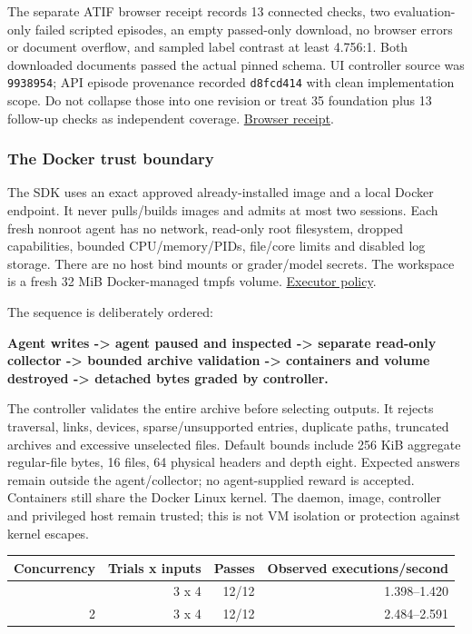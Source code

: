 \documentclass[
  11pt,
  letterpaper,
]{article}
\newcounter{none} %
\begin{document}
The separate ATIF browser receipt records 13 connected checks, two
evaluation-only failed scripted episodes, an empty passed-only download,
no browser errors or document overflow, and sampled label contrast at
least 4.756:1. Both downloaded documents passed the actual pinned
schema. UI controller source was \texttt{9938954}; API episode
provenance recorded \texttt{d8fcd414} with clean implementation scope.
Do not collapse those into one revision or treat 35 foundation plus 13
follow-up checks as independent coverage.
\href{../../artifacts/atif/qa/ui-report.json}{Browser receipt}.

\subsubsection{The Docker trust
boundary}\label{the-docker-trust-boundary}

The SDK uses an exact approved already-installed image and a local
Docker endpoint. It never pulls/builds images and admits at most two
sessions. Each fresh nonroot agent has no network, read-only root
filesystem, dropped capabilities, bounded CPU/memory/PIDs, file/core
limits and disabled log storage. There are no host bind mounts or
grader/model secrets. The workspace is a fresh 32 MiB Docker-managed
tmpfs volume. \href{../docker-executor.md}{Executor policy}.

The sequence is deliberately ordered:

\textbf{Agent writes -\textgreater{} agent paused and inspected
-\textgreater{} separate read-only collector -\textgreater{} bounded
archive validation -\textgreater{} containers and volume destroyed
-\textgreater{} detached bytes graded by controller.}

The controller validates the entire archive before selecting outputs. It
rejects traversal, links, devices, sparse/unsupported entries, duplicate
paths, truncated archives and excessive unselected files. Default bounds
include 256 KiB aggregate regular-file bytes, 16 files, 64 physical
headers and depth eight. Expected answers remain outside the
agent/collector; no agent-supplied reward is accepted. Containers still
share the Docker Linux kernel. The daemon, image, controller and
privileged host remain trusted; this is not VM isolation or protection
against kernel escapes.

{\def\LTcaptype{none} %
\begin{longtable}[]{@{}rrrr@{}}
\toprule\noalign{}
Concurrency & Trials x inputs & Passes & Observed executions/second \\
\midrule\noalign{}
\endhead
\bottomrule\noalign{}
\endlastfoot
1 & 3 x 4 & 12/12 & 1.398--1.420 \\
2 & 3 x 4 & 12/12 & 2.484--2.591 \\
\end{longtable}
}
\end{document}
